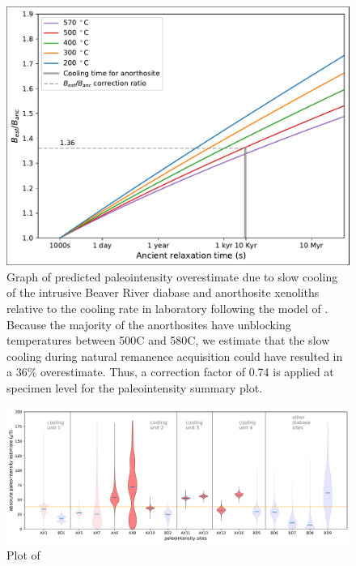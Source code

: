 \documentclass[9pt,twoside,lineno]{pnas-new}
\begin{document}
\begin{figure}[h!]
\noindent\includegraphics[width=17.8 cm]{Cooling_rate_correction.pdf}
\centering
\caption{{Graph of predicted paleointensity overestimate due to slow cooling of the intrusive Beaver River diabase and anorthosite xenoliths relative to the cooling rate in laboratory following the model of . Because the majority of the anorthosites have unblocking temperatures between 500\textdegree C and 580\textdegree C, we estimate that the slow cooling during natural remanence acquisition could have resulted in a 36\% overestimate. Thus, a correction factor of 0.74 is applied at specimen level for the paleointensity summary plot.  }}
\label{fig:PINT_cooling_corrected}
\end{figure}

\clearpage

\begin{figure}[h!]
\noindent\includegraphics[width=17.8 cm]{manuscript/PINT_BiCEP.pdf}
\centering
\caption{{Plot of }}
\label{fig:PINT_BiCEP}
\end{figure}
\end{document}
